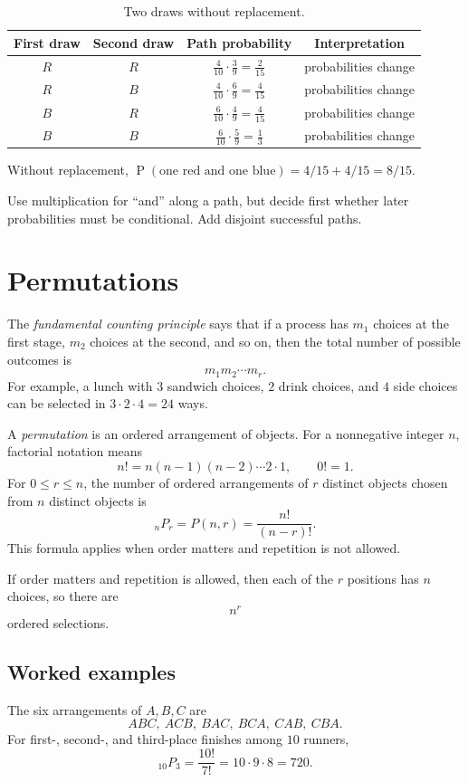 \documentclass[11pt]{article}
\newcommand{\Pp}{\operatorname{P}}
\begin{document}
\begin{table}[ht]
\centering
\caption{Two draws without replacement.}\label{tab:without-replacement}
\begin{tabular}{@{}cccc@{}}
\toprule
First draw & Second draw & Path probability & Interpretation \\
\midrule
$R$ & $R$ & $\frac{4}{10}\cdot\frac{3}{9}=\frac{2}{15}$ & probabilities change \\
$R$ & $B$ & $\frac{4}{10}\cdot\frac{6}{9}=\frac{4}{15}$ & probabilities change \\
$B$ & $R$ & $\frac{6}{10}\cdot\frac{4}{9}=\frac{4}{15}$ & probabilities change \\
$B$ & $B$ & $\frac{6}{10}\cdot\frac{5}{9}=\frac{1}{3}$ & probabilities change \\
\bottomrule
\end{tabular}
\end{table}

Without replacement, $\Pp(\text{one red and one blue})=4/15+4/15=8/15$.

\begin{keybox}
Use multiplication for ``and'' along a path, but decide first whether later
probabilities must be conditional.  Add disjoint successful paths.
\end{keybox}

\section{Permutations}\label{sec:permutations}
The \emph{fundamental counting principle} says that if a process has $m_1$
choices at the first stage, $m_2$ choices at the second, and so on, then the
total number of possible outcomes is
\[
m_1m_2\cdots m_r.
\]
For example, a lunch with $3$ sandwich choices, $2$ drink choices, and $4$ side
choices can be selected in $3\cdot2\cdot4=24$ ways.

A \emph{permutation} is an ordered arrangement of objects.  For a nonnegative
integer $n$, factorial notation means
\[
n!=n(n-1)(n-2)\cdots2\cdot1,\qquad 0!=1.
\]
For $0\leq r\leq n$, the number of ordered arrangements of $r$ distinct objects
chosen from $n$ distinct objects is
\[
{}_nP_r=P(n,r)=\frac{n!}{(n-r)!}.
\]
This formula applies when order matters and repetition is not allowed.

If order matters and repetition is allowed, then each of the $r$ positions has
$n$ choices, so there are
\[
n^r
\]
ordered selections.

\subsection{Worked examples}
The six arrangements of $A,B,C$ are
\[
ABC,\ ACB,\ BAC,\ BCA,\ CAB,\ CBA.
\]
For first-, second-, and third-place finishes among $10$ runners,
\[
{}_{10}P_3=\frac{10!}{7!}=10\cdot9\cdot8=720.
\]
\end{document}
